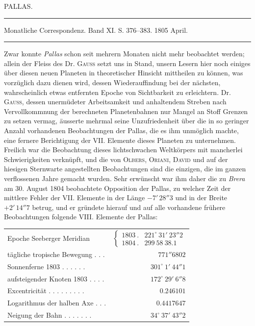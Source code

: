 \clearpage
{}
\hypertarget{native-267-lower}{}
\begin{center}
PALLAS.

\rule{0.5\linewidth}{0.4pt}

Monatliche Correspondenz. Band XI. S. 376–383. 1805 April.

\rule{0.5\linewidth}{0.4pt}
\end{center}

Zwar konnte \emph{Pallas} schon seit mehrern Monaten nicht mehr beobachtet werden; allein der Fleiss
des Dr. \textsc{Gauss} setzt uns in Stand, unsern Lesern hier noch einiges über diesen neuen Planeten in theoretischer
Hinsicht mittheilen zu können, was vorzüglich dazu dienen wird, dessen Wiederauffindung bei
der nächsten, wahrscheinlich etwas entfernten Epoche von Sichtbarkeit zu erleichtern. Dr. \textsc{Gauss}, dessen
unermüdeter Arbeitsamkeit und anhaltendem Streben nach Vervollkommnung der berechneten Planetenbahnen
nur Mangel an Stoff Grenzen zu setzen vermag, äusserte mehrmal seine Unzufriedenheit
über die in so geringer Anzahl vorhandenen Beobachtungen der Pallas, die es ihm unmöglich machte,
eine fernere Berichtigung der VII. Elemente dieses Planeten zu unternehmen. Freilich war die Beobachtung
dieses lichtschwachen Weltkörpers mit mancherlei Schwierigkeiten verknüpft, und die von \textsc{Olbers},
\textsc{Oriani}, \textsc{David} und auf der hiesigen Sternwarte angestellten Beobachtungen sind die einzigen, die
im ganzen verflossenen Jahre gemacht wurden. Sehr erwünscht war ihm daher die zu \emph{Brera} am 30.
August 1804 beobachtete Opposition der Pallas, zu welcher Zeit der mittlere Fehler der VII. Elemente
in der Länge $-7'\,28''3$ und in der Breite $+2'\,14''7$ betrug, und er gründete hierauf und auf alle vorhandene
frühere Beobachtungen folgende VIII. Elemente der Pallas:
\begin{center}
\begingroup\fontsize{9}{11}\selectfont\setlength{\tabcolsep}{3pt}\renewcommand{\arraystretch}{1.1}
\begin{tabular}{lr}
Epoche Seeberger Meridian  & $\left\{\begin{array}{lr}1803\ .&221^\circ\ 31'\ 23''2\\1804\ .&299\ 58\ 38.1\end{array}\right.$ \\
tägliche tropische Bewegung . . . & $771''6802$ \\
Sonnenferne 1803 . . . \raisebox{.3ex}{.} . . . & $301^\circ\ 1'\ 44''1$ \\
aufsteigender Knoten 1803 . . . . & $172^\circ\ 29'\ 6''8$ \\
Excentricität . . . . . . . . . & $0.246101$ \\
Logarithmus der halben Axe . . . & $0.4417647$ \\
Neigung der Bahn . . . . . . . & $34^\circ\ 37'\ 43''2$ \\
\end{tabular}\endgroup
\end{center}

